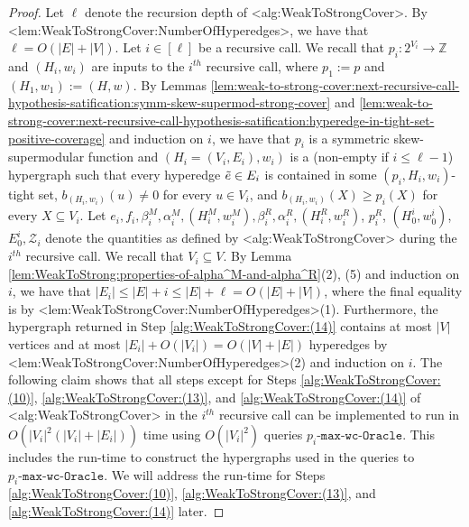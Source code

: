 \documentclass{article}
\def\Cref#1{<#1>}%
\newcommand{\zeros}{\ensuremath{\mathcal{Z}}\xspace}
\newcommand{\functionMaximizationOracle}[1]{\ensuremath{{#1}\text{-}\mathtt{max}\text{-}\mathtt{wc}\text{-}\mathtt{Oracle}}\xspace}
\providecommand{\Z}{\mathbb{Z}}
\begin{document}
\begin{proof}
Let $\ell$ denote the recursion depth of \Cref{alg:WeakToStrongCover}. By \Cref{lem:WeakToStrongCover:NumberOfHyperedges}, we have that $\ell=O(|E|+|V|)$. 
Let  $i \in [\ell]$ be a recursive call.
 We recall that $p_i:2^{V_i}\rightarrow\Z$ and $(H_i, w_i)$ are inputs to the $i^{th}$ recursive call, where $p_1 := p$ and $(H_1, w_1) := (H, w)$.
By Lemmas \ref{lem:weak-to-strong-cover:next-recursive-call-hypothesis-satification:symm-skew-supermod-strong-cover} and \ref{lem:weak-to-strong-cover:next-recursive-call-hypothesis-satification:hyperedge-in-tight-set-positive-coverage} and induction on $i$, we have that $p_i$ is a symmetric skew-supermodular function and $(H_i = (V_i, E_i), w_i)$ is a (non-empty if $i \leq \ell - 1$) hypergraph such that every hyperedge $\Tilde{e} \in E_i$ is contained in some $(p_i, H_i, w_i)$-tight set, $b_{(H_i, w_i)}(u) \not = 0$ for every $u \in V_i$, and $b_{(H_i, w_i)}(X) \geq p_i(X)$ for every $X \subseteq V_i$. Let $e_i, f_i, \beta_i^M, \alpha_i^M, (H_i^M, w_i^M), \beta_i^R, \alpha_i^R, (H_i^R, w_i^R)$, $p_i^R$, $(H_0^{i}, w_0^{i})$, $E_0^i, \zeros_i$ denote the quantities  as defined by \Cref{alg:WeakToStrongCover} during the $i^{th}$ recursive call. We recall that $V_i \subseteq V$. By Lemma \ref{lem:WeakToStrong:properties-of-alpha^M-and-alpha^R}(2), (5) and induction on $i$, we have that $|E_i| \leq |E| + i \leq |E| + \ell = O(|E| + |V|)$, where the final equality is by \Cref{lem:WeakToStrongCover:NumberOfHyperedges}(1). 
Furthermore, the hypergraph returned in Step \ref{alg:WeakToStrongCover:(14)} contains at most $|V|$ vertices and at most $|E_i| + O(|V_i|)= O(|V| + |E|)$ hyperedges by \Cref{lem:WeakToStrongCover:NumberOfHyperedges}(2) and induction on $i$. 
The following claim shows that all steps except for Steps \ref{alg:WeakToStrongCover:(10)},  \ref{alg:WeakToStrongCover:(13)}, and  \ref{alg:WeakToStrongCover:(14)} of \Cref{alg:WeakToStrongCover} in the $i^{th}$ recursive call can be implemented to run in $O(|V_i|^2(|V_i| + |E_i|))$ time
using $O(|V_i|^2)$ queries \functionMaximizationOracle{p_i}. This includes the run-time to construct the hypergraphs used in the queries to \functionMaximizationOracle{p_i}. We will address the run-time for Steps \ref{alg:WeakToStrongCover:(10)},  \ref{alg:WeakToStrongCover:(13)}, and  \ref{alg:WeakToStrongCover:(14)} later. 


\end{proof}
\end{document}
